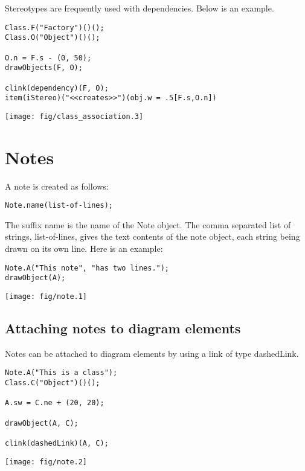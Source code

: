 \documentclass{article}
\newcommand{\code}{\ttfamily}
\begin{document}
Stereotypes are frequently used with dependencies. Below is an example.
\pagebreak

\begin{multicols}{2}
\begin{verbatim}
Class.F("Factory")()();
Class.O("Object")()();

O.n = F.s - (0, 50);
drawObjects(F, O);

clink(dependency)(F, O);
item(iStereo)("<<creates>>")(obj.w = .5[F.s,O.n])
\end{verbatim}
\columnbreak
\hspace{3cm}\texttt{[image: fig/class\_association.3]}
\end{multicols}

\section{Notes}

A note is created as follows:

\begin{verbatim}
Note.name(list-of-lines);
\end{verbatim}

The suffix {\code name} is the name of the {\code Note} object. The comma separated list of strings, {\code list-of-lines}, gives the text contents of the note object, each string being drawn on its own line.
Here is an example:

\begin{multicols}{2}
\begin{verbatim}
Note.A("This note", "has two lines.");
drawObject(A);
\end{verbatim}
\columnbreak
\hspace{3cm}\texttt{[image: fig/note.1]}
\end{multicols}

\subsection{Attaching notes to diagram elements}

Notes can be attached to diagram elements by using a link of type {\code dashedLink}.

\begin{multicols}{2}
\begin{verbatim}
Note.A("This is a class");
Class.C("Object")()();

A.sw = C.ne + (20, 20);

drawObject(A, C);

clink(dashedLink)(A, C);
\end{verbatim}
\columnbreak
\hspace{1cm}\texttt{[image: fig/note.2]}
\end{multicols}
\end{document}
